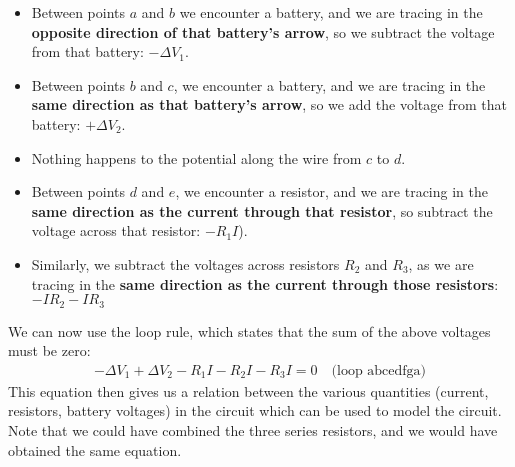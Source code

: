 \begin{itemize}
\item Between points $a$ and $b$ we encounter a battery, and we are tracing in the \textbf{opposite direction of that battery's arrow}, so we subtract the voltage from that battery: $-\Delta V_1$.
\item Between points $b$ and $c$, we encounter a battery, and we are tracing in the \textbf{same direction as that battery's arrow}, so we add the voltage from that battery: $+\Delta V_2$.
\item Nothing happens to the potential along the wire from $c$ to $d$.
\item Between points $d$ and $e$, we encounter a resistor, and we are tracing in the \textbf{same direction as the current through that resistor}, so subtract the voltage across that resistor: $-R_1I$).
\item Similarly, we subtract the voltages across resistors $R_2$ and $R_3$, as we are tracing in the \textbf{same direction as the current through those resistors}: $-IR_2-IR_3$
\end{itemize}
We can now use the loop rule, which states that the sum of the above voltages must be zero:
\begin{align*}
-\Delta V_1 + \Delta V_2 - R_1I - R_2I - R_3I = 0\quad \text{(loop abcedfga)}
\end{align*}
This equation then gives us a relation between the various quantities (current, resistors, battery voltages) in the circuit which can be used to model the circuit. Note that we could have combined the three series resistors, and we would have obtained the same equation. 

